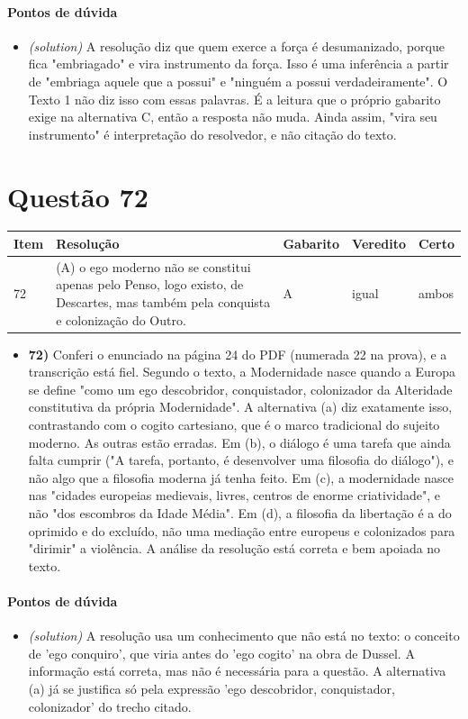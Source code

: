 \documentclass{article}%
\begin{document}
\paragraph{Pontos de dúvida}%
\begin{itemize}%
\item%
\textit{(solution)} A resolução diz que quem exerce a força é desumanizado, porque fica "embriagado" e vira instrumento da força. Isso é uma inferência a partir de "embriaga aquele que a possui" e "ninguém a possui verdadeiramente". O Texto 1 não diz isso com essas palavras. É a leitura que o próprio gabarito exige na alternativa C, então a resposta não muda. Ainda assim, "vira seu instrumento" é interpretação do resolvedor, e não citação do texto.%
\end{itemize}%
\section*{Questão 72}%
\begin{longtable}{@{}p{} p{} p{} p{} p{}@{}}\toprule Item & Resolução & Gabarito & Veredito & Certo \\ \midrule
72 & (A) o ego moderno não se constitui apenas pelo Penso, logo existo, de Descartes, mas também pela conquista e colonização do Outro. & A & igual & ambos \\
\bottomrule\end{longtable}%
\begin{itemize}%
\item%
\textbf{72)} Conferi o enunciado na página 24 do PDF (numerada 22 na prova), e a transcrição está fiel. Segundo o texto, a Modernidade nasce quando a Europa se define "como um ego descobridor, conquistador, colonizador da Alteridade constitutiva da própria Modernidade". A alternativa (a) diz exatamente isso, contrastando com o cogito cartesiano, que é o marco tradicional do sujeito moderno. As outras estão erradas. Em (b), o diálogo é uma tarefa que ainda falta cumprir ("A tarefa, portanto, é desenvolver uma filosofia do diálogo"), e não algo que a filosofia moderna já tenha feito. Em (c), a modernidade nasce nas "cidades europeias medievais, livres, centros de enorme criatividade", e não "dos escombros da Idade Média". Em (d), a filosofia da libertação é a do oprimido e do excluído, não uma mediação entre europeus e colonizados para "dirimir" a violência. A análise da resolução está correta e bem apoiada no texto.%
\end{itemize}%
\paragraph{Pontos de dúvida}%
\begin{itemize}%
\item%
\textit{(solution)} A resolução usa um conhecimento que não está no texto: o conceito de 'ego conquiro', que viria antes do 'ego cogito' na obra de Dussel. A informação está correta, mas não é necessária para a questão. A alternativa (a) já se justifica só pela expressão 'ego descobridor, conquistador, colonizador' do trecho citado.%
\end{itemize}%
\end{document}
